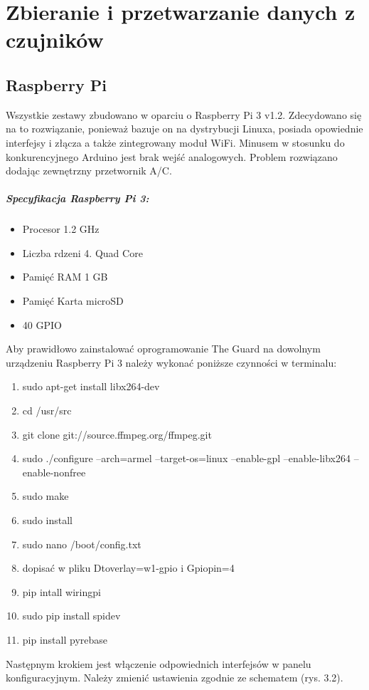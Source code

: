 \chapter{Zbieranie i przetwarzanie danych z czujników}

\section*{Raspberry Pi}
Wszystkie zestawy zbudowano w oparciu o Raspberry Pi 3 v1.2. Zdecydowano się na to rozwiązanie, ponieważ bazuje on na dystrybucji Linuxa, posiada opowiednie interfejsy i złącza a także zintegrowany moduł WiFi. Minusem w stosunku do konkurencyjnego Arduino jest brak wejść analogowych. Problem rozwiązano dodając zewnętrzny przetwornik A/C.
\paragraph{Specyfikacja Raspberry Pi 3:}
\begin{itemize} 
\item Procesor 1.2 GHz
\item Liczba rdzeni 4. Quad Core
\item Pamięć RAM 1 GB
\item Pamięć Karta microSD
\item 40 GPIO
\end{itemize}
Aby prawidłowo zainstalować oprogramowanie The Guard na dowolnym urządzeniu Raspberry Pi 3 należy wykonać poniższe czynności w terminalu:
\begin{enumerate} 
\item sudo apt-get install libx264-dev
\item cd /usr/src
\item git clone git://source.ffmpeg.org/ffmpeg.git
\item sudo ./configure --arch=armel --target-os=linux --enable-gpl --enable-libx264 --enable-nonfree
\item sudo make
\item sudo install
\item sudo nano /boot/config.txt
\item dopisać w pliku Dtoverlay=w1-gpio i Gpiopin=4
\item pip intall wiringpi
\item sudo pip install spidev
\item pip install pyrebase
\end{enumerate}
Następnym krokiem jest włączenie odpowiednich interfejsów w panelu konfiguracyjnym. Należy zmienić ustawienia zgodnie ze schematem (rys. 3.2).
